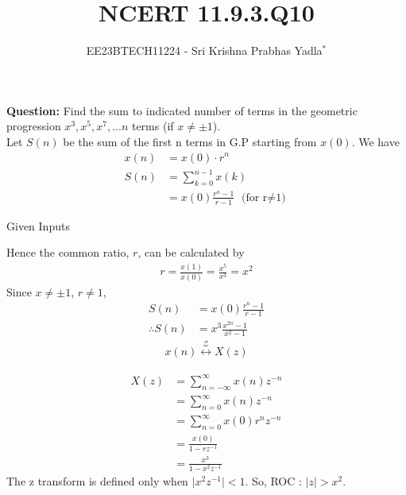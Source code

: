\documentclass[journal,12pt,twocolumn]{IEEEtran}
\theoremstyle{remark}
\begin{document}

\vspace{3cm}

\title{NCERT 11.9.3.Q10}
\author{EE23BTECH11224 - Sri Krishna Prabhas Yadla$^{*}$%
}
\maketitle
\newpage
\bigskip

\renewcommand{\thefigure}{\theenumi}
\renewcommand{\thetable}{\theenumi}


\vspace{3cm}
\textbf{Question:} Find the sum to indicated number of terms in the geometric progression \(x^3,x^5,x^7,...n\) terms (if \(x\neq\pm1\)).
\\
\solution
Let $S(n)$ be the sum of the first n terms in G.P starting from $x(0)$. We have
\begin{align}
    x(n) &= x(0) \cdot r^n \\
    S(n) &= \sum_{k=0}^{n-1}x(k) \\
    &= x(0) \frac{r^n-1}{r-1} \text{    (for r$\neq$1)}
\end{align}
\begin{table}[h]
    
    \label{tab:table1}
    \caption{Given Inputs}
\end{table}
\newline
Hence the common ratio, $r$, can be calculated by
\begin{align}
    r = \frac{x(1)}{x(0)} = \frac{x^5}{x^3} = x^2 
\end{align}
Since $x\neq\pm1$, $r\neq1$,
\begin{align}
    S(n) &= x(0) \frac{r^n-1}{r-1} \\
   \therefore S(n) &= x^3 \frac{x^{2n}-1}{x^2-1}
\end{align}
\newpage
\begin{align*}
	x(n) \stackrel{\mathcal{Z}}{\longleftrightarrow} X(z)
\end{align*}

\begin{align}
	X(z) &= \sum_{n=-\infty}^{\infty}x(n)z^{-n} \\
	&= \sum_{n=0}^{\infty}x(n)z^{-n} \\
	&= \sum_{n=0}^{\infty}x(0)r^nz^{-n} \\
	&= \frac{x(0)}{1-rz^{-1}} \\
	&= \frac{x^3}{1-x^2z^{-1}}
\end{align}
The z transform is defined only when $\lvert x^2z^{-1} \rvert<1$. So, ROC : $|z|>x^2$.
\end{document}
